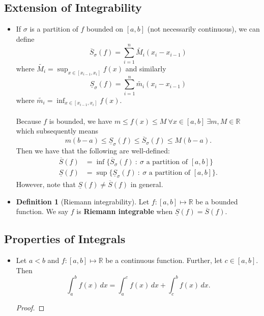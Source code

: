 \documentclass{article}
\newcommand{\R}{\mathbb{R}}
\newcommand{\?}{\stackrel{?}{=}}
\theoremstyle{definition} %
\newtheorem{definition}[theorem]{Definition} %
\begin{document}
\subsection{Extension of Integrability}

\begin{itemize}
    \item If $\sigma$ is a partition of $f$ bounded on $[a, b]$ (not necessarily continuous), we can define
    $$\overline{S}_\sigma(f) = \sum_{i = 1}^n \widetilde{M_i}(x_i - x_{i - 1})$$
    where $\widetilde{M_i} = \sup_{x \in [x_{i - 1}, x_{i}]} f(x)$ and similarly
    $$\underline{S}_\sigma(f) = \sum_{i = 1}^n \widetilde{m_i}(x_i - x_{i - 1})$$
    where $\widetilde{m_i} = \inf_{x \in [x_{i - 1}, x_i]} f(x)$. \\\\
    Because $f$ is bounded, we have $m \leq f(x) \leq M \ \forall x \in [a, b] \ \exists m, M \in \R$ which subsequently means
    $$m(b - a) \leq \underline{S}_{\sigma}(f) \leq \overline{S}_{\sigma}(f) \leq M(b - a).$$
    Then we have that the following are well-defined:
    \begin{align*}
        \overline{S}(f) &= \inf\{\overline{S}_{\sigma}(f) \ : \ \sigma \text{ a partition of } [a, b]\} \\
        \underline{S}(f) &= \sup\{\underline{S}_{\sigma}(f) \ : \ \sigma \text{ a partition of } [a, b]\}.
    \end{align*}
    However, note that $\underline{S}(f) \neq \overline{S}(f)$ in general.
    \item[]
    \begin{definition}[Riemann integrability]
        Let $f: [a, b] \mapsto \R$ be a bounded function. We say $f$ is \textbf{Riemann integrable} when $\underline{S}(f) = \overline{S}(f)$.
    \end{definition}
\end{itemize}

\subsection{Properties of Integrals}

\begin{itemize}
    \item[]
    \begin{lemma}
        Let $a < b$ and $f: [a, b] \mapsto \R$ be a continuous function. Further, let $c \in [a, b]$. Then
        $$\int_a^b f(x) \, dx = \int_a^c f(x) \, dx + \int_c^b f(x) \, dx.$$
    \end{lemma}
    \begin{proof}
        
    \end{proof}
\end{itemize}

\newpage

\listoftheorems[]
\end{document}

